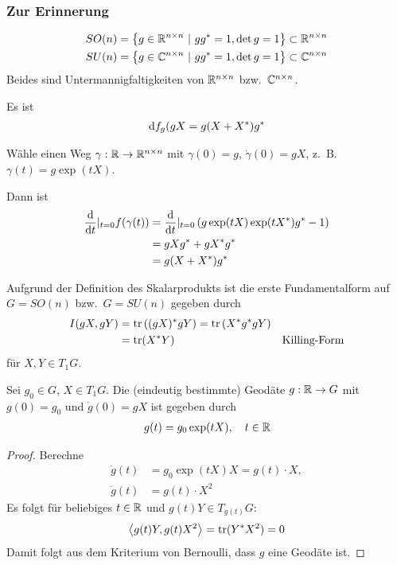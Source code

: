 \documentclass{skript}
\begin{document}
\subsubsection*{Zur Erinnerung}
\begin{align*}
  SO(n) &= \mdef[g\in\R^{n\times n}]{gg^*=1, \det g = 1 } \subset \R^{n\times n}
  \\
  SU(n) &= \mdef[g\in\C^{n\times n}]{gg^*=1, \det g = 1 } \subset \C^{n\times n}
\end{align*}
Beides sind Untermannigfaltigkeiten von $\mathbb{R}^{n\times n}$ bzw.\ $\mathbb{C}^{n\times n}$.

Es ist
\begin{align*}
  \mathrm d f_g(gX = g(X + X^*)g^*
\end{align*}

Wähle einen Weg $\gamma:\mathbb{R} \to \mathbb{R}^{n\times n}$ mit $\gamma(0) = g$, $\dot
\gamma(0) = gX$, z.~B.\ $\gamma(t) = g\exp(tX)$.

Dann ist
\begin{align*}
  \frac{\mathrm d}{\mathrm d t}\vert_{t=0}f(\gamma(t)) &= \frac{\mathrm d}{\mathrm d t}\vert_{t=0}\left(
  g\exp(tX)\exp(tX^*)g^* - 1 \right) \\
  &= gXg^* + gX^*g^* \\
  &= g(X + X^*)g^*
\end{align*}

Aufgrund der Definition des Skalarprodukts ist die erste Fundamentalform auf $G
= SO(n)$ bzw.\ $G = SU(n)$ gegeben durch
\begin{align*}
  I(gX, gY) &= \operatorname{tr}\left( (gX)^*gY \right) = \operatorname{tr}\left( X^*g^*gY \right) \\
            &= \operatorname{tr}(X^*Y) & \text{Killing-Form}
\end{align*}
für $X,Y \in T_1G$.

\begin{lem}
  Sei $g_0\in G$, $X\in T_1G$. Die (eindeutig bestimmte) Geodäte $g:\mathbb{R}\to G$ mit
  $g(0) = g_0$ und $\dot g(0) = gX$ ist gegeben durch
  \begin{align*}
    g(t) = g_0\exp(tX), \quad t\in\mathbb{R}
  \end{align*}

  \begin{proof}
    Berechne
    \begin{align*}
      \dot g(t) &= g_0\exp(tX) X = g(t)\cdot X, \\
      \ddot g(t) &= g(t)\cdot X^2
    \end{align*}
    Es folgt für beliebiges $t\in\mathbb{R}$ und $g(t)Y \in T_{g(t)}G$:
    \begin{align*}
      \sprod{g(t)Y, g(t)X^2} = \tr(Y^*X^2) = 0
    \end{align*}
    Damit folgt aus dem Kriterium von Bernoulli, dass $g$ eine Geodäte ist.
  \end{proof}
\end{lem}
\end{document}
